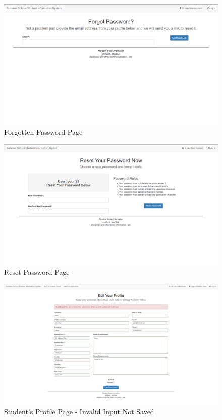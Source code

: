 \documentclass{project}
\begin{document}
\begin{figure}[h]
\includegraphics[width=\linewidth]{password-forget.png}
\caption{Forgotten Password Page}
\label{fig:forgot-password}
\end{figure}
\begin{figure}[h]
\includegraphics[width=\linewidth]{password-reset.png}
\caption{Reset Password Page}
\label{fig:reset-password}
\end{figure}
\begin{figure}[h]
\includegraphics[width=\linewidth]{profile-edit-incorrect.png}
\caption{Student's Profile Page - Invalid Input Not Saved}
\label{fig:students-profile-bad-input}
\end{figure}
\end{document}
